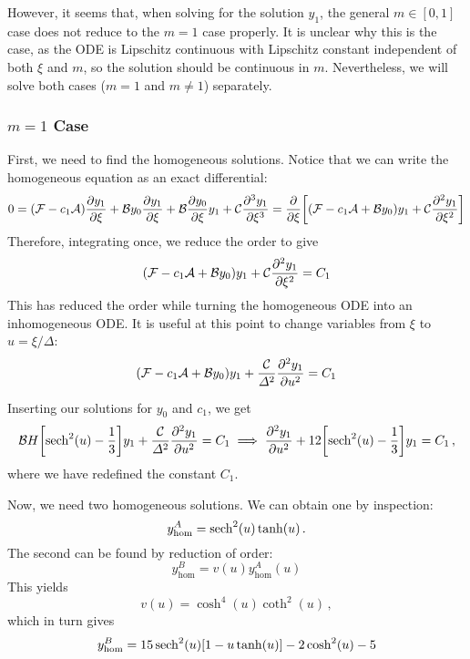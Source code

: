 \documentclass{jfm}
\let\Oldsubsubsection\subsubsection
\renewcommand{\subsubsection}{\FloatBarrier\Oldsubsubsection}
\begin{document}
However, it seems that, when solving for the solution $y_1$, the general
$m \in [0,1]$ case does not reduce to the $m=1$ case properly.
It is unclear why this is the case, as the ODE is Lipschitz continuous
with Lipschitz constant independent of both $\xi$ and $m$, so the
solution should be continuous in $m$.
Nevertheless, we will solve both cases ($m=1$ and $m \neq 1$)
separately.

\subsubsection{\texorpdfstring{$m=1$}{Solitary Wave} Case}
First, we need to find the homogeneous solutions.
Notice that we can write the homogeneous equation as an exact
differential:
\begin{equation}
  0 = \pqty{\mathcal{F} -c_1 \mathcal{A}} \pdv{y_1}{\xi}
    + \mathcal{B} y_0 \pdv{y_1}{\xi}
    + \mathcal{B} \pdv{y_0}{\xi} y_1
    + \mathcal{C} \pdv[3]{y_1}{\xi}
  = \pdv{\xi} \bqty{
    \pqty{\mathcal{F} -c_1 \mathcal{A} + \mathcal{B} y_0} y_1
    + \mathcal{C} \pdv[2]{y_1}{\xi}
    }
\end{equation}
Therefore, integrating once, we reduce the order to give
\begin{equation}
    \pqty{\mathcal{F} -c_1 \mathcal{A} + \mathcal{B} y_0} y_1
    + \mathcal{C} \pdv[2]{y_1}{\xi}
    = C_1
\end{equation}
This has reduced the order while turning the homogeneous ODE into an
inhomogeneous ODE.
It is useful at this point to change variables from $\xi$ to $u =
\xi/\Delta$:
\begin{equation}
    \pqty{\mathcal{F} -c_1 \mathcal{A} + \mathcal{B} y_0} y_1
    + \frac{\mathcal{C}}{\Delta^2} \pdv[2]{y_1}{u}
    = C_1
\end{equation}

Inserting our solutions for $y_0$ and $c_1$, we get
\begin{equation}
  \mathcal{B} H \bqty{\sech^2 (u) - \frac{1}{3}} y_1
    + \frac{\mathcal{C}}{\Delta^2} \pdv[2]{y_1}{u} = C_1
  \implies
  \pdv[2]{y_1}{u} + 12 \bqty{\sech^2 (u) - \frac{1}{3}} y_1 = C_1 \,,
\end{equation}
where we have redefined the constant $C_1$.

Now, we need two homogeneous solutions.
We can obtain one by inspection:
\begin{equation}
  y^A_{\text{hom}} =
    \sech^2(u) \tanh(u) \,.
\end{equation}
The second can be found by reduction of order:
\begin{equation}
  y^B_{\text{hom}} = v(u) y^A_{\text{hom}}(u)
\end{equation}
This yields
\begin{equation}
  v(u) = \cosh^4(u) \coth^2(u) \,,
\end{equation}
which in turn gives
\begin{equation}
  y^B_{\text{hom}} = 15 \sech^2(u) \bqty{1-u \tanh(u)}-2 \cosh^2(u)-5
\end{equation}
\end{document}
